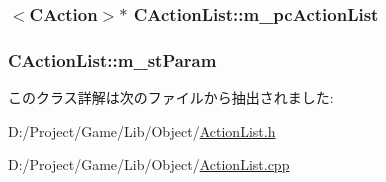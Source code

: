 \subsubsection[{m\+\_\+pc\+Action\+List}]{$<${\bf C\+Action}$>$$\ast$ C\+Action\+List\+::m\+\_\+pc\+Action\+List\hspace{0.3cm}{\ttfamily [private]}}\label{class_c_action_list_ac374ad0c0bc4b0d86a4a33064f16b1dc}
\hypertarget{class_c_action_list_a32027728142c6e1af28240a59ed009bb}{}
\subsubsection[{m\+\_\+st\+Param}]{ C\+Action\+List\+::m\+\_\+st\+Param\hspace{0.3cm}{\ttfamily [private]}}\label{class_c_action_list_a32027728142c6e1af28240a59ed009bb}


このクラス詳解は次のファイルから抽出されました\+:\begin{DoxyCompactItemize}
\item 
D\+:/\+Project/\+Game/\+Lib/\+Object/\hyperlink{_action_list_8h}{Action\+List.\+h}\item 
D\+:/\+Project/\+Game/\+Lib/\+Object/\hyperlink{_action_list_8cpp}{Action\+List.\+cpp}\end{DoxyCompactItemize}
